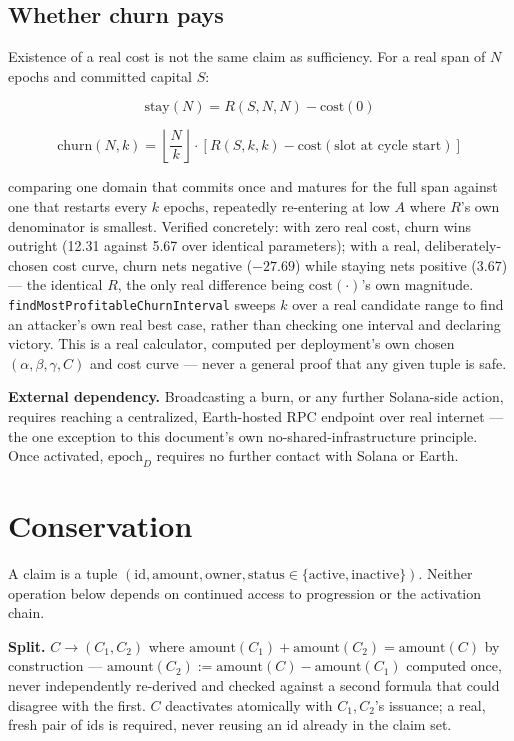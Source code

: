 \documentclass[10pt]{article}
\newcommand{\code}[1]{\texttt{\small #1}}
\begin{document}
\subsection{Whether churn pays}

Existence of a real cost is not the same claim as sufficiency. For a real span of $N$ epochs and committed capital $S$:

\[
\text{stay}(N) = R(S, N, N) - \mathrm{cost}(0)
\]

\[
\text{churn}(N, k) = \left\lfloor \frac{N}{k} \right\rfloor \cdot \left[R(S, k, k) - \mathrm{cost}(\text{slot at cycle start})\right]
\]

comparing one domain that commits once and matures for the full span against one that restarts every $k$ epochs, repeatedly re-entering at low $A$ where $R$'s own denominator is smallest. Verified concretely: with zero real cost, churn wins outright (12.31 against 5.67 over identical parameters); with a real, deliberately-chosen cost curve, churn nets negative ($-27.69$) while staying nets positive ($3.67$) --- the identical $R$, the only real difference being $\mathrm{cost}(\cdot)$'s own magnitude. \code{findMostProfitableChurnInterval} sweeps $k$ over a real candidate range to find an attacker's own real best case, rather than checking one interval and declaring victory. This is a real calculator, computed per deployment's own chosen $(\alpha,\beta,\gamma,C)$ and cost curve --- never a general proof that any given tuple is safe.

\textbf{External dependency.} Broadcasting a burn, or any further Solana-side action, requires reaching a centralized, Earth-hosted RPC endpoint over real internet --- the one exception to this document's own no-shared-infrastructure principle. Once activated, $\mathrm{epoch}_D$ requires no further contact with Solana or Earth.

\section{Conservation}

A claim is a tuple $(\mathrm{id}, \mathrm{amount}, \mathrm{owner}, \mathrm{status} \in \{\mathrm{active}, \mathrm{inactive}\})$. Neither operation below depends on continued access to progression or the activation chain.

\textbf{Split.} $C \to (C_1, C_2)$ where $\mathrm{amount}(C_1) + \mathrm{amount}(C_2) = \mathrm{amount}(C)$ by construction --- $\mathrm{amount}(C_2) := \mathrm{amount}(C) - \mathrm{amount}(C_1)$ computed once, never independently re-derived and checked against a second formula that could disagree with the first. $C$ deactivates atomically with $C_1, C_2$'s issuance; a real, fresh pair of ids is required, never reusing an id already in the claim set.
\end{document}
